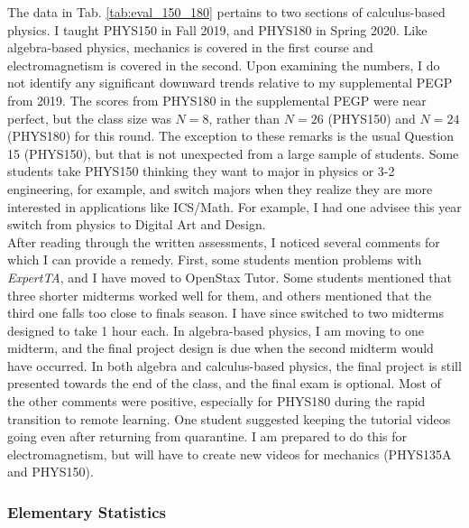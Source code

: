 \documentclass[../../main.tex]{subfiles}
\begin{document}
The data in Tab. \ref{tab:eval_150_180} pertains to two sections of calculus-based physics.  I taught PHYS150 in Fall 2019, and PHYS180 in Spring 2020.  Like algebra-based physics, mechanics is covered in the first course and electromagnetism is covered in the second.  Upon examining the numbers, I do not identify any significant downward trends relative to my supplemental PEGP from 2019.  The scores from PHYS180 in the supplemental PEGP were near perfect, but the class size was $N = 8$, rather than $N = 26$ (PHYS150) and $N = 24$ (PHYS180) for this round.  The exception to these remarks is the usual Question 15 (PHYS150), but that is not unexpected from a large sample of students.  Some students take PHYS150 thinking they want to major in physics or 3-2 engineering, for example, and switch majors when they realize they are more interested in applications like ICS/Math.  For example, I had one advisee this year switch from physics to Digital Art and Design.
\\
\vspace{0.25cm}
After reading through the written assessments, I noticed several comments for which I can provide a remedy.  First, some students mention problems with \textit{ExpertTA}, and I have moved to OpenStax Tutor.  Some students mentioned that three shorter midterms worked well for them, and others mentioned that the third one falls too close to finals season.  I have since switched to two midterms designed to take 1 hour each.  In algebra-based physics, I am moving to one midterm, and the final project design is due when the second midterm would have occurred.  In both algebra and calculus-based physics, the final project is still presented towards the end of the class, and the final exam is optional.  Most of the other comments were positive, especially for PHYS180 during the rapid transition to remote learning.  One student suggested keeping the tutorial videos going even after returning from quarantine.  I am prepared to do this for electromagnetism, but will have to create new videos for mechanics (PHYS135A and PHYS150).

\subsubsection{Elementary Statistics}
\end{document}
